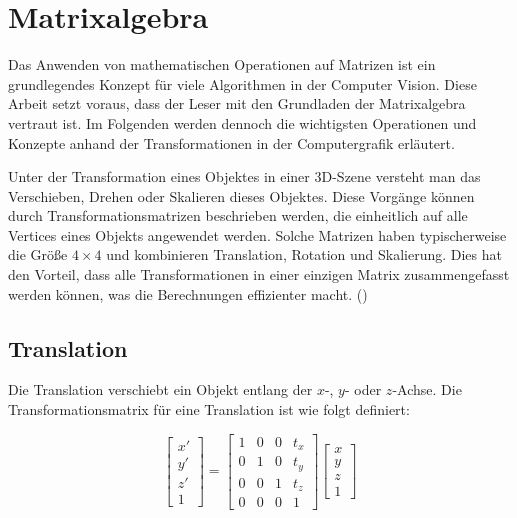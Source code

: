 \section{Matrixalgebra}

Das Anwenden von mathematischen Operationen auf Matrizen ist ein grundlegendes Konzept für viele Algorithmen in der Computer Vision. Diese Arbeit setzt voraus, dass der Leser mit den Grundladen der Matrixalgebra vertraut ist. Im Folgenden werden dennoch die wichtigsten Operationen und Konzepte anhand der Transformationen in der Computergrafik erläutert.

Unter der Transformation eines Objektes in einer 3D-Szene versteht man das Verschieben, Drehen oder Skalieren dieses Objektes. Diese Vorgänge können durch Transformationsmatrizen beschrieben werden, die einheitlich auf alle Vertices eines Objekts angewendet werden. Solche Matrizen haben typischerweise die Größe \(4 \times 4\) und kombinieren Translation, Rotation und Skalierung. Dies hat den Vorteil, dass alle Transformationen in einer einzigen Matrix zusammengefasst werden können, was die Berechnungen effizienter macht. (\cite{jazz2020transformMatrix, pezzi2021matrices, freescale2010math3d})

\subsection{Translation}

Die Translation verschiebt ein Objekt entlang der \(x\)-, \(y\)- oder \(z\)-Achse. Die Transformationsmatrix für eine Translation ist wie folgt definiert:

\begin{equation}
\begin{bmatrix}
x' \\ y' \\ z' \\ 1
\end{bmatrix}
=
\begin{bmatrix}
1 & 0 & 0 & t_x \\
0 & 1 & 0 & t_y \\
0 & 0 & 1 & t_z \\
0 & 0 & 0 & 1
\end{bmatrix}
\begin{bmatrix}
x \\ y \\ z \\ 1
\end{bmatrix}
\end{equation}

